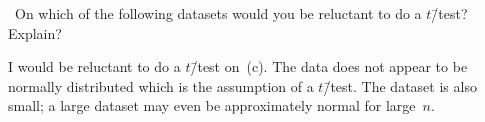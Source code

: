 \begin{problem}
  ~On which of the following datasets would you be reluctant to do a $t$\=/test?  Explain?
\end{problem}

I would be reluctant to do a $t$\=/test on~(c). The data does not appear to be normally distributed which is the assumption of a $t$\=/test.  The dataset is also small; a large dataset may even be approximately normal for large~$n$.
